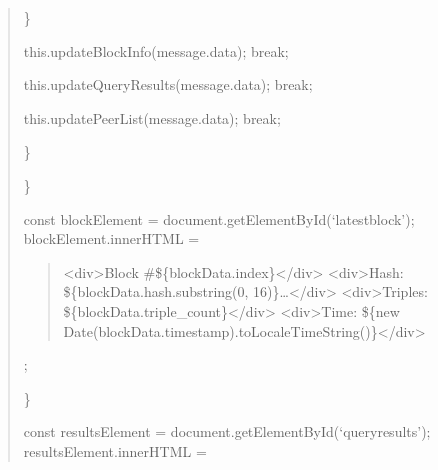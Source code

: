 \documentclass[letterpaper,10pt,english]{sphinxmanual}
\begin{document}
\begin{quote}
\begin{description}
\end{description}

\sphinxAtStartPar
\}
\begin{description}
\begin{description}
\begin{description}
\sphinxAtStartPar
this.updateBlockInfo(message.data);
break;

\sphinxAtStartPar
this.updateQueryResults(message.data);
break;

\sphinxAtStartPar
this.updatePeerList(message.data);
break;

\end{description}

\end{description}

\sphinxAtStartPar
\}

\end{description}

\sphinxAtStartPar
\}
\begin{description}
\sphinxAtStartPar
const blockElement = document.getElementById(‘latest\sphinxhyphen{}block’);
blockElement.innerHTML = \textasciigrave{}
\begin{quote}

\sphinxAtStartPar
\textless{}div\textgreater{}Block \#\$\{blockData.index\}\textless{}/div\textgreater{}
\textless{}div\textgreater{}Hash: \$\{blockData.hash.substring(0, 16)\}…\textless{}/div\textgreater{}
\textless{}div\textgreater{}Triples: \$\{blockData.triple\_count\}\textless{}/div\textgreater{}
\textless{}div\textgreater{}Time: \$\{new Date(blockData.timestamp).toLocaleTimeString()\}\textless{}/div\textgreater{}
\end{quote}

\sphinxAtStartPar
{\color{red}\bfseries{}\textasciigrave{}};

\end{description}

\sphinxAtStartPar
\}
\begin{description}
\sphinxAtStartPar
const resultsElement = document.getElementById(‘query\sphinxhyphen{}results’);
resultsElement.innerHTML = \textasciigrave{}
\begin{quote}


\end{quote}
\end{description}
\end{quote}
\end{document}
